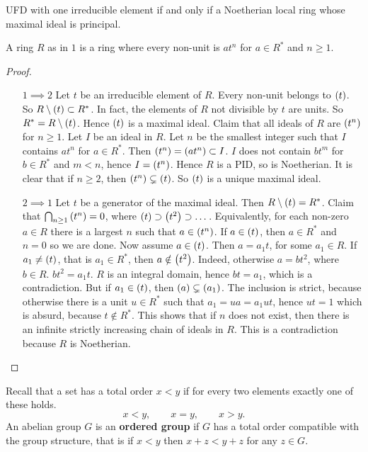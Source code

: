 \begin{theorem}
UFD with one irreducible element if and only if a Noetherian local ring whose maximal ideal is principal.
\end{theorem}

A ring $ R $ as in $ 1 $ is a ring where every non-unit is $ at^n $ for $ a \in R^* $ and $ n \ge 1 $.

\begin{proof}
\hfill
\begin{itemize}[leftmargin=0.5in]
\item[$ 1 \implies 2 $] Let $ t $ be an irreducible element of $ R $. Every non-unit belongs to $ \left( t \right) $. So $ R \setminus \left( t \right) \subset R^* $. In fact, the elements of $ R $ not divisible by $ t $ are units. So $ R^* = R \setminus \left( t \right) $. Hence $ \left( t \right) $ is a maximal ideal. Claim that all ideals of $ R $ are $ \left( t^n \right) $ for $ n \ge 1 $. Let $ I $ be an ideal in $ R $. Let $ n $ be the smallest integer such that $ I $ contains $ at^n $ for $ a \in R^* $. Then $ \left( t^n \right) = \left( at^n \right) \subset I $. $ I $ does not contain $ bt^m $ for $ b \in R^* $ and $ m < n $, hence $ I = \left( t^n \right) $. Hence $ R $ is a PID, so is Noetherian. It is clear that if $ n \ge 2 $, then $ \left( t^n \right) \subsetneq \left( t \right) $. So $ \left( t \right) $ is a unique maximal ideal.
\item[$ 2 \implies 1 $] Let $ t $ be a generator of the maximal ideal. Then $ R \setminus \left( t \right) = R^* $. Claim that $ \bigcap_{n \ge 1} \left( t^n \right) = 0 $, where $ \left( t \right) \supset \left( t^2 \right) \supset \dots $. Equivalently, for each non-zero $ a \in R $ there is a largest $ n $ such that $ a \in \left( t^n \right) $. If $ a \in \left( t \right) $, then $ a \in R^* $ and $ n = 0 $ so we are done. Now assume $ a \in \left( t \right) $. Then $ a = a_1t $, for some $ a_1 \in R $. If $ a_1 \ne \left( t \right) $, that is $ a_1 \in R^* $, then $ a \notin \left( t^2 \right) $. Indeed, otherwise $ a = bt^2 $, where $ b \in R $. $ bt^2 = a_1t $. $ R $ is an integral domain, hence $ bt = a_1 $, which is a contradiction. But if $ a_1 \in \left( t \right) $, then $ \left( a \right) \subsetneq \left( a_1 \right) $. The inclusion is strict, because otherwise there is a unit $ u \in R^* $ such that $ a_1 = ua = a_1ut $, hence $ ut = 1 $ which is absurd, because $ t \notin R^* $. This shows that if $ n $ does not exist, then there is an infinite strictly increasing chain of ideals in $ R $. This is a contradiction because $ R $ is Noetherian.
\end{itemize}
\end{proof}

Recall that a set has a total order $ x < y $ if for every two elements exactly one of these holds.
$$ x < y, \qquad x = y, \qquad x > y. $$
An abelian group $ G $ is an \textbf{ordered group} if $ G $ has a total order compatible with the group structure, that is if $ x < y $ then $ x + z < y + z $ for any $ z \in G $.

